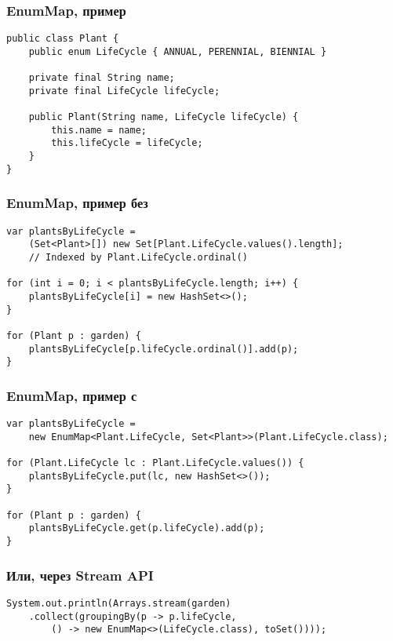 \documentclass[xetex,mathserif,serif]{beamer}
\begin{document}
	\begin{frame}[fragile]
		\frametitle{EnumMap, пример}
		\begin{verbatim}
public class Plant {
    public enum LifeCycle { ANNUAL, PERENNIAL, BIENNIAL }
    
    private final String name;
    private final LifeCycle lifeCycle;
    
    public Plant(String name, LifeCycle lifeCycle) {
        this.name = name;
        this.lifeCycle = lifeCycle;
    }
}
		\end{verbatim}
	\end{frame}

	\begin{frame}[fragile]
		\frametitle{EnumMap, пример без}
		\begin{verbatim}
var plantsByLifeCycle = 
    (Set<Plant>[]) new Set[Plant.LifeCycle.values().length];
    // Indexed by Plant.LifeCycle.ordinal()

for (int i = 0; i < plantsByLifeCycle.length; i++) {
    plantsByLifeCycle[i] = new HashSet<>();
}

for (Plant p : garden) {
    plantsByLifeCycle[p.lifeCycle.ordinal()].add(p);
}
		\end{verbatim}
	\end{frame}

	\begin{frame}[fragile]
		\frametitle{EnumMap, пример с}
		\begin{verbatim}
var plantsByLifeCycle =
    new EnumMap<Plant.LifeCycle, Set<Plant>>(Plant.LifeCycle.class);

for (Plant.LifeCycle lc : Plant.LifeCycle.values()) {
    plantsByLifeCycle.put(lc, new HashSet<>());
}

for (Plant p : garden) {
    plantsByLifeCycle.get(p.lifeCycle).add(p);
}
		\end{verbatim}
	\end{frame}

	\begin{frame}[fragile]
		\frametitle{Или, через Stream API}
		\begin{verbatim}
System.out.println(Arrays.stream(garden)
    .collect(groupingBy(p -> p.lifeCycle,
        () -> new EnumMap<>(LifeCycle.class), toSet())));
		\end{verbatim}
	\end{frame}
\end{document}
